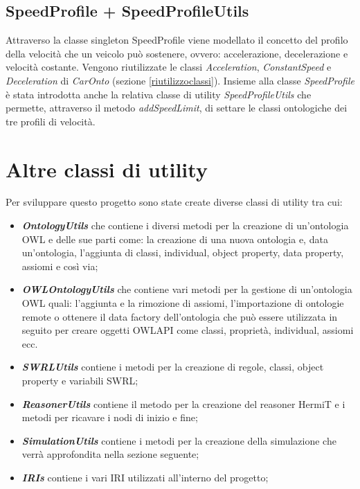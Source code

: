 \subsection{SpeedProfile + SpeedProfileUtils}
Attraverso la classe singleton SpeedProfile viene modellato il concetto del profilo della velocit\`a che un veicolo pu\`o sostenere, ovvero: accelerazione, decelerazione e velocit\`a costante.
Vengono riutilizzate le classi \textit{Acceleration}, \textit{ConstantSpeed} e \textit{Deceleration} di \textit{CarOnto} (sezione \ref{riutilizzoclassi}).
Insieme alla classe \textit{SpeedProfile} \`e stata introdotta anche la relativa classe di utility \textit{SpeedProfileUtils} che permette, attraverso il metodo \textit{addSpeedLimit}, di settare le classi ontologiche dei tre profili di velocit\`a.
\section{Altre classi di utility}
Per sviluppare questo progetto sono state create diverse classi di utility tra cui:
\begin{itemize}
\item \textit{\textbf{OntologyUtils}} che contiene i diversi metodi per la creazione di un'ontologia OWL e delle sue parti come: la creazione di una nuova ontologia e, data un'ontologia, l'aggiunta di classi, individual, object property, data property, assiomi e cos\`i via;
\item \textit{\textbf{OWLOntologyUtils}} che contiene vari metodi per la gestione di un'ontologia OWL quali: l'aggiunta e la rimozione di assiomi, l'importazione di ontologie remote o ottenere il data factory dell'ontologia che pu\`o essere utilizzata in seguito per creare oggetti OWLAPI come classi, propriet\`a, individual, assiomi ecc.
\item \textit{\textbf{SWRLUtils}} contiene i metodi per la creazione di regole, classi, object property e variabili SWRL;
\item \textit{\textbf{ReasonerUtils}} contiene il metodo per la creazione del reasoner HermiT e i metodi per ricavare i nodi di inizio e fine;
\item \textit{\textbf{SimulationUtils}} contiene i metodi per la creazione della simulazione che verr\`a approfondita nella sezione seguente;
\item \textit{\textbf{IRIs}} contiene i vari IRI utilizzati all'interno del progetto;
\end{itemize}

